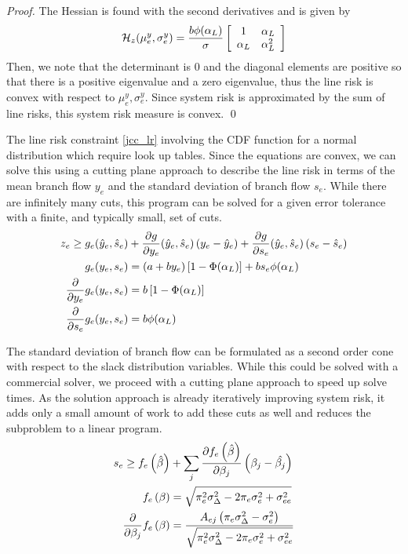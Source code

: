 \begin{proof}
The Hessian is found with the second derivatives and is given by
\begin{equation}
\mathcal{H}_z(\mu^y_e,\sigma^y_e) = \frac{b \phi(\alpha_L)}{\sigma}
\left[ 
\begin{array}{c c}
1 & \alpha_L \\
\alpha_L & \alpha_L^2
\end{array}
\right]
\end{equation}
Then, we note that the determinant is 0 and the diagonal elements are positive so that there is a positive eigenvalue and a zero eigenvalue, thus the line risk is convex with respect to $\mu^y_e, \sigma^y_e$.  Since system risk is approximated by the sum of line risks, this system risk measure is convex. \qed
\end{proof}

The line risk constraint \ref{jcc_lr} involving the CDF function for a normal distribution which require look up tables. Since the equations are convex, we can solve this using a cutting plane approach to describe the line risk in terms of the mean branch flow $y_e$ and the standard deviation of branch flow $s_e$.  While there are infinitely many cuts, this program can be solved for a given error tolerance with a finite, and typically small, set of cuts.
\begin{subequations}
\label{line_risk_cuts}
\begin{align}
z_e \geq g_e(\hat{y}_e,\hat{s}_e) &+ \frac{\partial g}{\partial y_e}(\hat{y}_e,\hat{s}_e) \left(y_e - \hat{y}_e \right) 
+ \frac{\partial g}{\partial s_e}(\hat{y}_e,\hat{s}_e) \left(s_e - \hat{s}_e \right) \\
g_e(y_e,s_e) &= (a + b y_e)\left[ 1 - \Phi(\alpha_L) \right]  + b s_e \phi(\alpha_L)  \\
 \frac{\partial}{\partial y_e}g_e(y_e,s_e) &= b\left[ 1 - \Phi(\alpha_L) \right]\\
\frac{\partial}{\partial s_e}g_e(y_e,s_e) &= b \phi(\alpha_L) 
\end{align}
\end{subequations}

The standard deviation of branch flow can be formulated as a second order cone with respect to the slack distribution variables.  While this could be solved with a commercial solver, we proceed with a cutting plane approach to speed up solve times.  As the solution approach is already iteratively improving system risk, it adds only a small amount of work to add these cuts as well and reduces the subproblem to a linear program.
\begin{subequations}
\label{branch_var_cuts}
\begin{align}
s_e \geq f_e\left(\hat{\beta}\right) &+ \sum_j \frac{\partial f_e\left(\hat{\beta} \right)}{\partial \beta_j} \left( \beta_j - \hat{\beta_j} \right)\\
  f_e\left(\beta\right) &= \sqrt{\pi_e^2 \sigma_\Delta^2 - 2 \pi_e \sigma_e^2  + \sigma_{ee}^2 }\\
  \frac{\partial}{\partial \beta_j}f_e\left(\beta\right) &= \frac{A_{ej} \left( \pi_e \sigma_\Delta^2 - \sigma_e^2 \right)}{\sqrt{\pi_e^2 \sigma_\Delta^2 - 2 \pi_e \sigma_e^2  + \sigma_{ee}^2 }}
\end{align}
\end{subequations}




